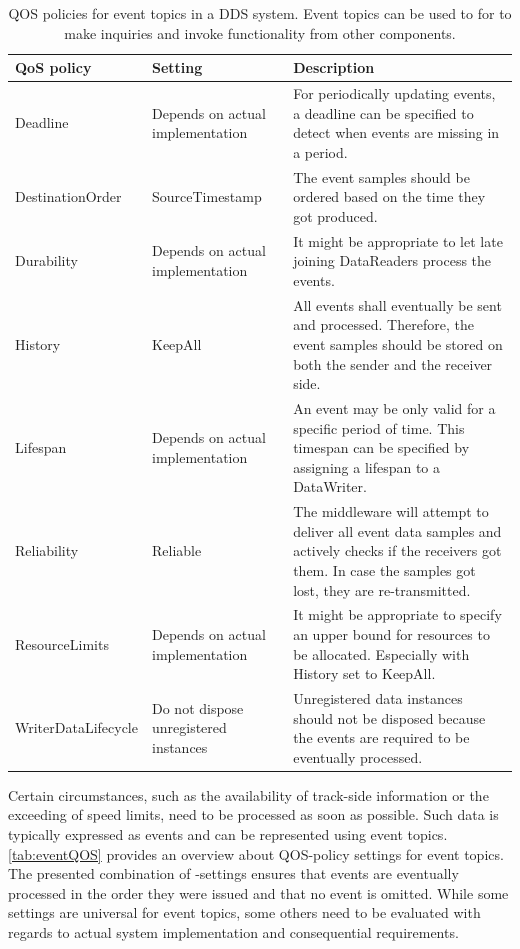 \begin{table}[htbp!]
	\begin{center}
		\caption{\Gls*{QOS} policies for event topics in a \gls*{DDS} system. Event topics can be used to for  to make inquiries and invoke functionality from other components.}
		\label{tab:eventQOS}
		\begin{tabularx}{\textwidth}{|X|X|X|}
			\hline
			\textbf{QoS policy} & \textbf{Setting} & \textbf{Description}\\
			\hline \hline
			Deadline & Depends on actual implementation & For periodically updating events, a deadline can be specified to detect when events are missing in a period. \\
			\hline
			DestinationOrder & SourceTimestamp & The event samples should be ordered based on the time they got produced. \\
			\hline
			Durability & Depends on actual implementation & It might be appropriate to let late joining DataReaders process the events. \\
			\hline
			History & KeepAll & All events shall eventually be sent and processed. Therefore, the event samples should be stored on both the sender and the receiver side.  \\
			\hline
			Lifespan & Depends on actual implementation & An event may be only valid for a specific period of time. This timespan can be specified by assigning a lifespan to a DataWriter. \\
			\hline
			Reliability & Reliable & The middleware will attempt to deliver all event data samples and actively checks if the receivers got them. In case the samples got lost, they are re-transmitted. \\
			\hline
			ResourceLimits & Depends on actual implementation & It might be appropriate to specify an upper bound for resources to be allocated. Especially with History set to KeepAll. \\
			\hline
			WriterDataLifecycle & Do not dispose unregistered instances & Unregistered data instances should not be disposed because the events are required to be eventually processed. \\
			\hline
		\end{tabularx}
	\end{center}
\end{table}

Certain circumstances, such as the availability of track-side information or the exceeding of speed limits, need to be processed as soon as possible.
Such data is typically expressed as events and can be represented using event topics.
\autoref{tab:eventQOS} provides an overview about \gls*{QOS}-policy settings for event topics.
The presented combination of -settings ensures that events are eventually processed in the order they were issued and that no event is omitted.
While some settings are universal for event topics, some others need to be evaluated with regards to actual system implementation and consequential requirements.


